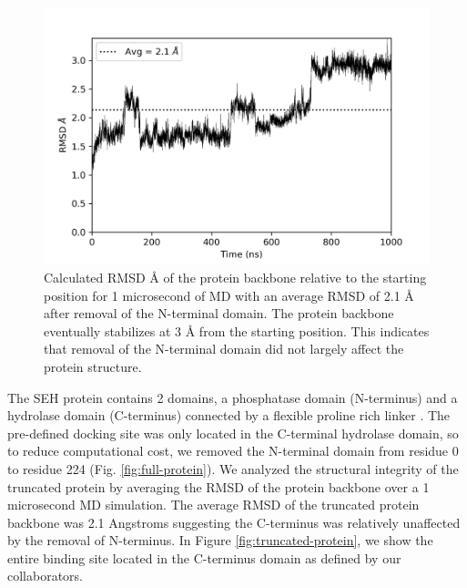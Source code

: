 \begin{figure}
    \centering
    \includegraphics{chapter6/Figures/protein-bb-rmsd.png}
    \caption[SEH Backbone RMSD after N-terminal domain removal]{Calculated RMSD {\AA} of the protein backbone relative to the starting position for 1 microsecond of MD with an average RMSD of 2.1 {\AA} after removal of the N-terminal domain. The protein backbone eventually stabilizes at 3 {\AA} from the starting position. This indicates that removal of the N-terminal domain did not largely affect the protein structure.}
    \label{fig:protein-bb-rmsd}
\end{figure}

The SEH protein contains 2 domains, a phosphatase domain (N-terminus) and a hydrolase domain (C-terminus) connected by a flexible proline rich linker \cite{doi:10.1021/bi050842g}.
The pre-defined docking site was only located in the C-terminal hydrolase domain, so to reduce computational cost, we removed the N-terminal domain from residue 0 to residue 224 (Fig. \ref{fig:full-protein}).
We analyzed the structural integrity of the truncated protein by averaging the RMSD of the protein backbone over a 1 microsecond MD simulation.
The average RMSD of the truncated protein backbone was 2.1 Angstroms suggesting the C-terminus was relatively unaffected by the removal of N-terminus.
In Figure \ref{fig:truncated-protein}, we show the entire binding site located in the C-terminus domain as defined by our collaborators.

